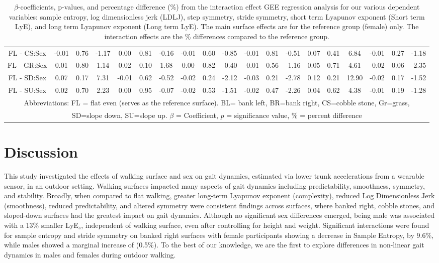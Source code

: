 \documentclass[authoryear,preprint,review,12pt]{elsarticle}
\begin{document}
{\begin{landscape}
\begin{table}[t]
\begin{tabular}{cccc|ccc|ccc|ccc|ccc|ccc}
        FL - CS:Sex	&	-0.01&	0.76&	-1.17&	0.00&	0.81&	-0.16&	-0.01&	0.60&	-0.85&	-0.01&	0.81&	-0.51&	0.07&	0.41&	6.84&	-0.01&	0.27&	-1.18\\
        FL - GR:Sex	&	0.01&	0.80&	1.14&	0.02&	0.10&	1.68&	0.00&	0.82&	-0.40&	-0.01&	0.56&	-1.16&	0.05&	0.71&	4.61&	-0.02&	0.06&	-2.35\\
        FL - SD:Sex	&	0.07&	0.17&	7.31&	-0.01&	0.62&	-0.52&	-0.02&	0.24&	-2.12&	-0.03&	0.21&	-2.78&	0.12&	0.21&	12.90&	-0.02&	0.17&	-1.52\\
        FL - SU:Sex &	0.02&	0.70&	2.23&	0.00&	0.95&	-0.07&	-0.02&	0.53&	-1.51&	-0.02&	0.47&	-2.26&	0.04&	0.62&	4.38&	-0.01&	0.19&	-1.28\\ \hline
        \multicolumn{19}{c}{\scriptsize Abbreviations: FL = flat even (serves as the reference surface). BL= bank left, BR=bank right, CS=cobble stone, Gr=grass, } \\
         \multicolumn{19}{c}{\scriptsize SD=slope down, SU=slope up. $\beta$ = Coefficient, $p$ = significance value, $\%$ = percent difference}
    \end{tabular}
    \caption{$\beta$-coefficients, p-values, and percentage difference ($\%$) from the interaction effect GEE regression analysis for our various dependent variables: sample entropy, log dimensionless jerk (LDLJ), step symmetry, stride symmetry, short term Lyapunov exponent (Short term LyE), and long term Lyapunov exponent (Long term LyE). The main surface effects are for the reference group (female) only. The interaction effects are the \% differences compared to the reference group.}
    \label{tab:GEE-perc}
\end{table}

    \end{landscape}
    \clearpage%
}

\section{Discussion}
\label{disc}

This study investigated the effects of walking surface and sex on gait dynamics, estimated via lower trunk accelerations from a wearable sensor, in an outdoor setting. Walking surfaces impacted many aspects of gait dynamics including predictability, smoothness, symmetry, and stability. Broadly, when compared to flat walking, greater long-term Lyapunov exponent (complexity), reduced Log Dimensionless Jerk (smoothness), reduced predictability, and altered symmetry were consistent findings across surfaces, where banked right, cobble stones, and sloped-down surfaces had the greatest impact on gait dynamics. Although no significant sex differences emerged, being male was associated with a 13\% smaller LyE${_s}$, independent of walking surface, even after controlling for height and weight. Significant interactions were found for sample entropy and stride symmetry on banked right surfaces with female participants showing a decrease in Sample Entropy, by 9.6\%, while males showed a marginal increase of (0.5\%). To the best of our knowledge, we are  the first to explore differences in non-linear gait dynamics in males and females during outdoor walking. 
\end{document}
